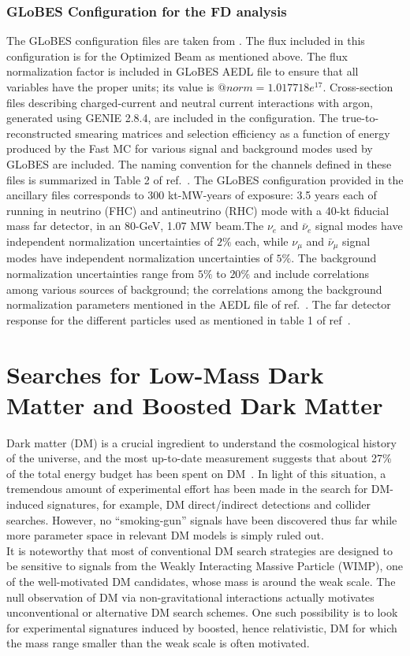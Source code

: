  \subsubsection{GLoBES Configuration for the FD analysis}
The GLoBES configuration files are taken from \cite{Alion:2016uaj}.  The flux included in this configuration is for the Optimized Beam as mentioned above. The flux normalization factor is included in GLoBES AEDL file to ensure that all variables have the proper units; its value is $@norm = 1.017718e^{17}$. Cross-section files describing charged-current and neutral current interactions with argon, generated using GENIE 2.8.4, are included in the configuration. The true-to-reconstructed
smearing matrices and selection efficiency as a function of energy produced by the Fast MC for various signal and background modes used by GLoBES are included. The naming convention for the channels defined in these files is summarized in Table 2 of ref.~\cite{Alion:2016uaj}. The GLoBES configuration provided in the ancillary files corresponds to 300 kt-MW-years of exposure: 3.5 years each of running in neutrino (FHC) and antineutrino (RHC) mode with a 40-kt fiducial mass far detector, in an 80-GeV, 1.07 MW beam.The $\nu_{e}$ and $\bar\nu_{e}$ signal  modes have independent normalization uncertainties of $2\%$ each, while $\nu_{\mu}$ and $\bar{\nu}_{\mu}$ signal modes have independent normalization uncertainties of $5\%$. The background normalization uncertainties range from $5\%$ to $20\%$ and include
correlations among various sources of background; the correlations among the background normalization
parameters mentioned in the AEDL file of ref.~\cite{Alion:2016uaj}. The far detector response for the different particles used as mentioned in table 1 of ref~\cite{Alion:2016uaj}.

\section{Searches for Low-Mass  Dark Matter and Boosted Dark Matter}
Dark matter (DM) is a crucial ingredient to understand the cosmological history of the universe, and the most up-to-date measurement suggests that about 27\% of the total energy budget has been spent on DM~\cite{Aghanim:2018eyx}. In light of this situation, a tremendous amount of experimental effort has been made in the search for DM-induced signatures, for example, DM direct/indirect detections and collider searches. However, no ``smoking-gun'' signals have been discovered thus far while more parameter space in relevant DM models is simply ruled out.\\ 
It is noteworthy that most of conventional DM search strategies are designed to be sensitive to signals from the Weakly Interacting Massive Particle (WIMP), one of the well-motivated DM candidates, whose mass is around the weak scale. 
The null observation of DM via non-gravitational interactions actually motivates unconventional or alternative DM search schemes. 
One such possibility is to look for experimental signatures induced by boosted, hence relativistic, DM for which the mass range smaller than the weak scale is often motivated. 

